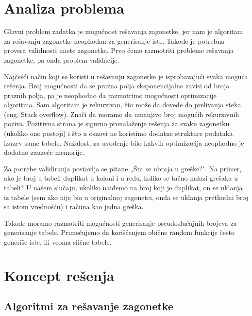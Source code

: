 \documentclass[a4paper]{article}
\begin{document}
    \section{Analiza problema}
    \par Glavni problem zadatka je mogućnost rešavanja zagonetke, jer nam je algoritam za rešavanju zagonetke neophodan za generisanje iste. Takođe je potrebna provera
    validnosti unete zagonetke. Prvo ćemo razmotriti probleme rešavanja zagonetke, pa onda problem validacije.
    \par Najčešći način koji se koristi u rešavanju zagonetke je isprobavajući svaka moguća rešenja. Broj mogućnosti da se prazna polja eksponencijalno zavisi od broja praznih polja, pa je
    neophodno da razmotrimo mogućnosti optimizacije algoritma. Sam algoritam je rekurzivan, što može da dovede do 
    prelivanja steka (eng. Stack overflow). Znači da moramo da umanjivo broj mogućih rekurzivnih poziva. Pozitivna strana je sigurno pronalaženje 
    rešenja za svaku zagonetku (ukoliko ono postoji) i što u osnovi ne koristimo dodatne strukture podataka izuzev same tabele. Nažalost, za uvođenje bilo kakvih optimizacija neophodno je
    dodatno zauzeće memorije.
    \par Za potrebe validiranja postavlja se pitane „Šta se ubraja u greške?". Na primer, ako je broj u tabeli duplikat u koloni i u redu, koliko se tačno nalazi grešaka u tabeli?
    U našem slučaju, ukoliko naiđemo na broj koji je duplikat, on se uklanja iz tabele (sem ako nije bio u originalnoj zagonetci, onda se uklanja prethodni broj sa istom vrednošću) i računa kao jedna greška.
    \par Takođe moramo razmotriti mogućnosti generisanje pseudoslučajnih brojeva za generisanje tabele. Primećujemo da korišćenjem obične random funkcije često generiše iste,
    ili veoma slične tabele.
    \newpage

    \section{Koncept rešenja}
    
    \subsection{Algoritmi za rešavanje zagonetke}
\end{document}
